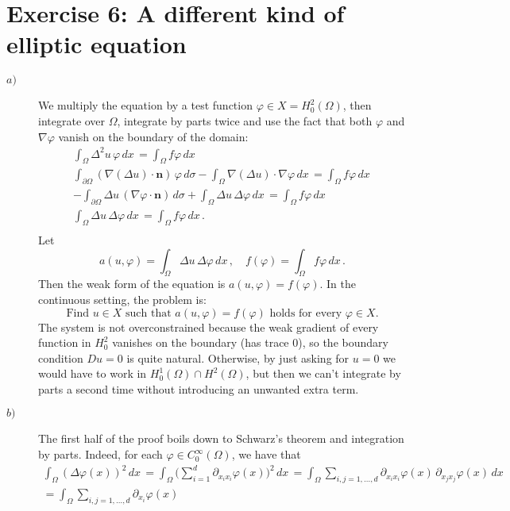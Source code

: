 \documentclass[a4paper]{article}
\renewcommand{\vec}[1]{\mathbf{#1}}
\newcommand{\dx}{\, dx \,}
\newcommand{\dsigma}{\, d\sigma}
\begin{document}
\section*{Exercise 6: A different kind of elliptic equation}
\begin{description}
\item[$a)$] We multiply the equation by a test function
	$\varphi \in X = H^2_0(\Omega)$, then integrate over $\Omega$,
	integrate by parts twice and use the fact that both $\varphi$
	and 	$\nabla \varphi$ vanish on the boundary of the domain:
	\begin{gather*}
	\int_\Omega \Delta^2 u \, \varphi \dx
	= \int_\Omega f \varphi \dx \\
	\int_{\partial \Omega} (\nabla (\Delta u) \cdot \vec{n}) \, \varphi \dsigma
	-\int_\Omega \nabla (\Delta u) \cdot \nabla \varphi \dx
	= \int_\Omega f \varphi \dx \\
	-\int_{\partial \Omega} \Delta u \, (\nabla \varphi \cdot \vec{n}) \dsigma
	+\int_\Omega \Delta u \, \Delta \varphi \dx
	= \int_\Omega f \varphi \dx \\
	\int_\Omega \Delta u \, \Delta \varphi \dx
	= \int_\Omega f \varphi \dx. \\
	\end{gather*}
	Let
	\[
	a(u,\varphi) = \int_\Omega \Delta u \, \Delta \varphi \dx,
	\quad f(\varphi) = \int_\Omega f \varphi \dx.
	\]
	Then the weak form of the equation is $a(u,\varphi) = f(\varphi)$.
	In the continuous setting, the problem is:
	\[
	\text{Find } u \in X \text{ such that }
	a(u,\varphi) = f(\varphi) \text{ holds for every } \varphi \in X.
	\]
	The system is not overconstrained because the weak gradient of every
	function in $H_0^2$ vanishes on the boundary (has trace 0),
	so the boundary condition $Du = 0$ is quite natural.
	Otherwise, by just asking for $u=0$ we would have to work
	in $H_0^1(\Omega) \cap H^2(\Omega)$, but then we can't integrate
	by parts a second time without introducing an unwanted extra term.
\item[$b)$] The first half of the proof boils down to Schwarz's theorem
	and integration by parts. Indeed, for each $\varphi \in C_0^\infty(\Omega)$,
	we have that
	\begin{gather*}
	\int_\Omega (\Delta\varphi(x))^2 \dx
	= \int_\Omega \big( \sum_{i=1}^d \partial_{x_i x_i} \varphi(x) \big)^2 \dx
	= \int_\Omega \sum_{i,j=1,\dots,d} \partial_{x_i x_i} \varphi(x) \,
	                                   \partial_{x_j x_j} \varphi(x) \dx \\
	= \int_\Omega \sum_{i,j=1,\dots,d} \partial_{x_i} \varphi(x) \,

\end{gather*}
\end{description}
\end{document}
